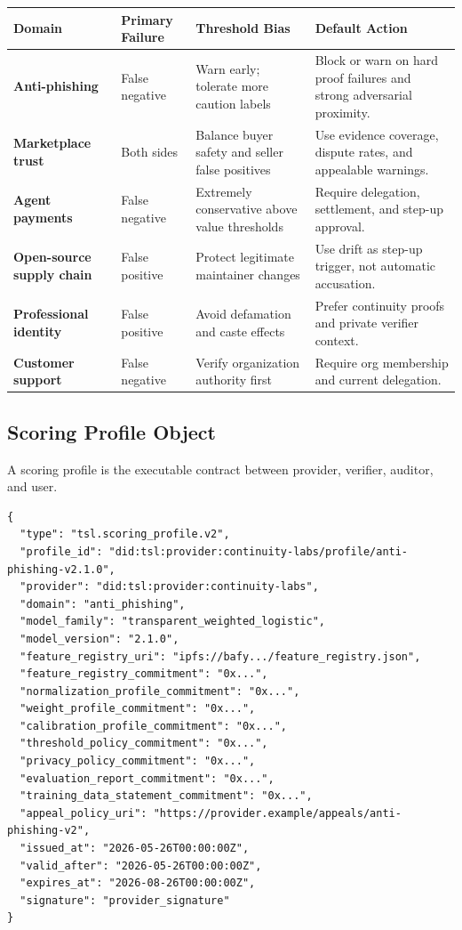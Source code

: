 \documentclass[11pt]{article}
\begin{document}
\begin{center}
\begin{tabularx}{\textwidth}{>{\bfseries}p{} p{} p{} X}
\toprule
Domain & Primary Failure & Threshold Bias & Default Action \\
\midrule
Anti-phishing & False negative & Warn early; tolerate more caution labels & Block or warn on hard proof failures and strong adversarial proximity. \\
Marketplace trust & Both sides & Balance buyer safety and seller false positives & Use evidence coverage, dispute rates, and appealable warnings. \\
Agent payments & False negative & Extremely conservative above value thresholds & Require delegation, settlement, and step-up approval. \\
Open-source supply chain & False positive & Protect legitimate maintainer changes & Use drift as step-up trigger, not automatic accusation. \\
Professional identity & False positive & Avoid defamation and caste effects & Prefer continuity proofs and private verifier context. \\
Customer support & False negative & Verify organization authority first & Require org membership and current delegation. \\
\bottomrule
\end{tabularx}
\end{center}

\subsection{Scoring Profile Object}

A scoring profile is the executable contract between provider, verifier, auditor, and user.

\begin{lstlisting}[style=tslcode]
{
  "type": "tsl.scoring_profile.v2",
  "profile_id": "did:tsl:provider:continuity-labs/profile/anti-phishing-v2.1.0",
  "provider": "did:tsl:provider:continuity-labs",
  "domain": "anti_phishing",
  "model_family": "transparent_weighted_logistic",
  "model_version": "2.1.0",
  "feature_registry_uri": "ipfs://bafy.../feature_registry.json",
  "feature_registry_commitment": "0x...",
  "normalization_profile_commitment": "0x...",
  "weight_profile_commitment": "0x...",
  "calibration_profile_commitment": "0x...",
  "threshold_policy_commitment": "0x...",
  "privacy_policy_commitment": "0x...",
  "evaluation_report_commitment": "0x...",
  "training_data_statement_commitment": "0x...",
  "appeal_policy_uri": "https://provider.example/appeals/anti-phishing-v2",
  "issued_at": "2026-05-26T00:00:00Z",
  "valid_after": "2026-05-26T00:00:00Z",
  "expires_at": "2026-08-26T00:00:00Z",
  "signature": "provider_signature"
}
\end{lstlisting}
\end{document}
